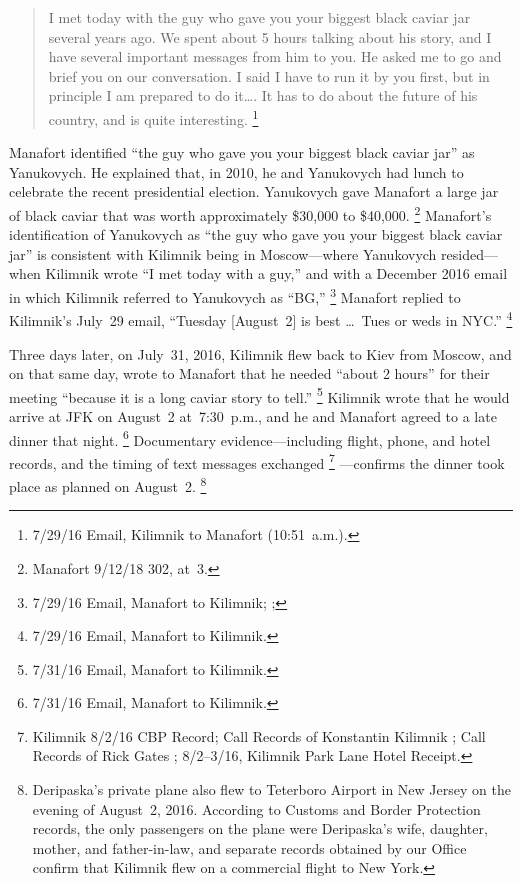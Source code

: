 \begin{quote}
I met today with the guy who gave you your biggest black caviar jar several years ago.
We spent about 5 hours talking about his story, and I have several important messages from him to you.
He asked me to go and brief you on our conversation.
I said I have to run it by you first, but in principle I am prepared to do it\dots.
It has to do about the future of his country, and is quite interesting.%
\footnote{7/29/16 Email, Kilimnik to Manafort (10:51~a.m.).}
\end{quote}

Manafort identified ``the guy who gave you your biggest black caviar jar'' as Yanukovych.
He explained that, in 2010, he and Yanukovych had lunch to celebrate the recent presidential election.
Yanukovych gave Manafort a large jar of black caviar that was worth approximately \$30,000 to \$40,000.%
\footnote{Manafort 9/12/18 302, at~3.}
Manafort's identification of Yanukovych as ``the guy who gave you your biggest black caviar jar'' is consistent with Kilimnik being in Moscow---where Yanukovych resided---when Kilimnik wrote ``I met today with a guy,'' and with a December 2016 email in which Kilimnik referred to Yanukovych as ``BG,''
\footnote{7/29/16 Email, Manafort to Kilimnik; ; }
Manafort replied to Kilimnik's July~29 email, ``Tuesday [August~2] is best \dots\ Tues or weds in NYC.''%
\footnote{7/29/16 Email, Manafort to Kilimnik.}

Three days later, on July~31, 2016, Kilimnik flew back to Kiev from Moscow, and on that same day, wrote to Manafort that he needed ``about 2 hours'' for their meeting ``because it is a long caviar story to tell.''%
\footnote{7/31/16 Email, Manafort to Kilimnik.}
Kilimnik wrote that he would arrive at JFK on August~2 at~7:30~p.m., and he and Manafort agreed to a late dinner that night.%
\footnote{7/31/16 Email, Manafort to Kilimnik.}
Documentary evidence---including flight, phone, and hotel records, and the timing of text messages exchanged%
\footnote{Kilimnik 8/2/16 CBP Record; Call Records of Konstantin Kilimnik ; Call Records of Rick Gates ; 8/2--3/16, Kilimnik Park Lane Hotel Receipt.}%
---confirms the dinner took place as planned on August~2.%
\footnote{Deripaska's private plane also flew to Teterboro Airport in New Jersey on the evening of August~2, 2016. According to Customs and Border Protection records, the only passengers on the plane were Deripaska's wife, daughter, mother, and father-in-law, and separate records obtained by our Office confirm that Kilimnik flew on a commercial flight to New York.}

